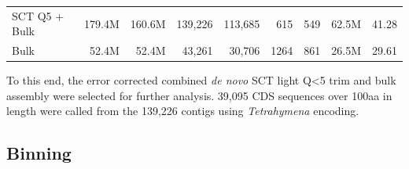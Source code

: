 \begin{table}[h]
\begin{tabular}{|l|rrrrrrrl}
SCT Q5 + Bulk                  & 179.4M                                  & 160.6M                                                                                              & 139,226                                & 113,685                                & 615                             & 549                                     & 62.5M                                             & 41.28                     \\ \cline{1-1}
Bulk                           & 52.4M                                   & 52.4M                                                                                               & 43,261                                 & 30,706                                 & 1264                            & 861                                     & 26.5M                                             & 29.61                     \\ \cline{1-1}
\end{tabular}
\end{table}






To this end, the error corrected combined \textit{de novo} SCT light Q<5 trim and bulk assembly were selected for further analysis.
39,095 CDS sequences over 100aa in length were called from the 139,226 contigs using \textit{Tetrahymena} encoding.

\subsection{Binning}



